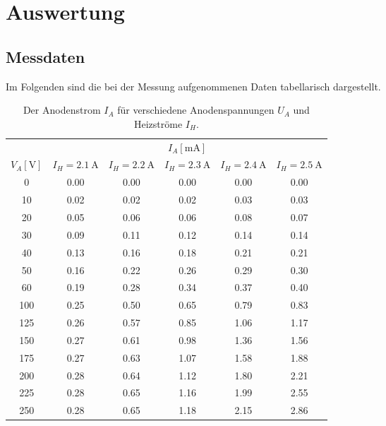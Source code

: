 \section{Auswertung}
\label{sec:Auswertung}
\subsection{Messdaten}
\label{sec:mess}
Im Folgenden sind die bei der Messung aufgenommenen Daten tabellarisch dargestellt.
\begin{table}[H]
    \centering
    \caption{Der Anodenstrom $I_A$ für verschiedene Anodenspannungen $U_A$ und Heizströme $I_H$.}
    \label{tab:mess1}
    \begin{tabular}{S[table-format=3.0] S S S S S}
        \toprule
        &
        \\
        \cmidrule(lr){2-6}
        {$V_A [\si{\volt}]$} &
        {$I_H=\SI{2.1}{\ampere}$} & {$I_H=\SI{2.2}{\ampere}$} & {$I_H=\SI{2.3}{\ampere}$} & {$I_H=\SI{2.4}{\ampere}$} & {$I_H=\SI{2.5}{\ampere}$} \\
            &  0.00  &  0.00  &  0.00  &  0.00  &  0.00 \\
        10   &  0.02  &  0.02  &  0.02  &  0.03  &  0.03 \\
        20   &  0.05  &  0.06  &  0.06  &  0.08  &  0.07 \\
        30   &  0.09  &  0.11  &  0.12  &  0.14  &  0.14 \\
        40   &  0.13  &  0.16  &  0.18  &  0.21  &  0.21 \\
        50   &  0.16  &  0.22  &  0.26  &  0.29  &  0.30 \\
        60   &  0.19  &  0.28  &  0.34  &  0.37  &  0.40 \\
        100  &  0.25  &  0.50  &  0.65  &  0.79  &  0.83 \\
        125  &  0.26  &  0.57  &  0.85  &  1.06  &  1.17 \\
        150  &  0.27  &  0.61  &  0.98  &  1.36  &  1.56 \\
        175  &  0.27  &  0.63  &  1.07  &  1.58  &  1.88 \\
        200  &  0.28  &  0.64  &  1.12  &  1.80  &  2.21 \\
        225  &  0.28  &  0.65  &  1.16  &  1.99  &  2.55 \\
        250  &  0.28  &  0.65  &  1.18  &  2.15  &  2.86 \\
        \bottomrule
    \end{tabular}
\end{table}
